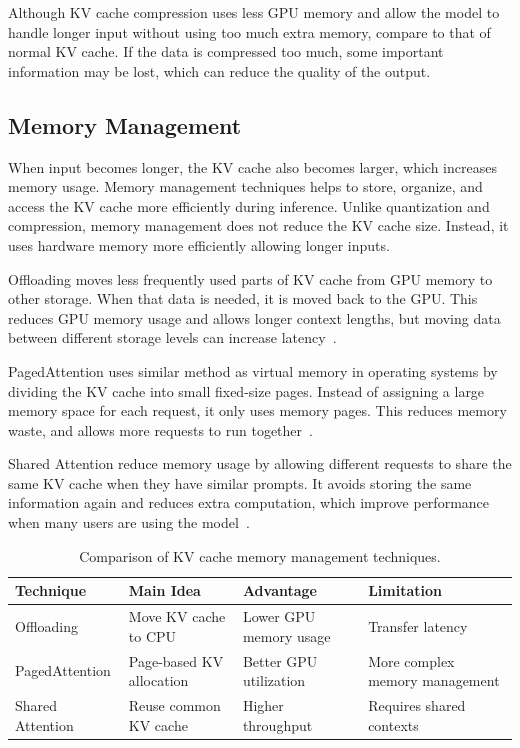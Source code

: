 \documentclass[conference]{IEEEtran}
\begin{document}
Although KV cache compression uses less GPU memory and allow the model to handle longer input without using too much extra memory, compare to that of normal KV cache. If the data is compressed too much, some important information may be lost, which can reduce the quality of the output.

\subsection{Memory Management}
\label{sec:memory}
When input becomes longer, the KV cache also becomes larger, which increases memory usage. Memory management techniques helps to store, organize, and access the KV cache more efficiently during inference. Unlike quantization and compression, memory management does not reduce the KV cache size. Instead, it uses hardware memory more efficiently allowing longer inputs.

Offloading moves less frequently used parts of KV cache from GPU memory to other storage. When that data is needed, it is moved back to the GPU. This reduces GPU memory usage and allows longer context lengths, but moving data between different storage levels can increase latency~\cite{sheng2023flexgen}.

PagedAttention uses similar method as virtual memory in operating systems by dividing the KV cache into small fixed-size pages. Instead of assigning a large memory space for each request, it only uses memory pages. This reduces memory waste, and allows more requests to run together~\cite{kwon2023vllm}.

Shared Attention reduce memory usage by allowing different requests to share the same KV cache when they have similar prompts. It avoids storing the same information again and reduces extra computation, which improve performance when many users are using the model~\cite{fawaz2024beyond}.
\begin{table}[htbp]
	\centering
	\caption{Comparison of KV cache memory management techniques.}
	\label{tab:kv_management}
	\small
	\begin{tabularx}{\linewidth}{lXXX}
		\toprule
		\textbf{Technique} & \textbf{Main Idea}       & \textbf{Advantage}     & \textbf{Limitation}            \\
		\midrule
		Offloading         & Move KV cache to CPU     & Lower GPU memory usage & Transfer latency               \\
		\midrule
		PagedAttention     & Page-based KV allocation & Better GPU utilization & More complex memory management \\
		\midrule
		Shared Attention   & Reuse common KV cache    & Higher throughput      & Requires shared contexts       \\
		\bottomrule
	\end{tabularx}
\end{table}
\end{document}
